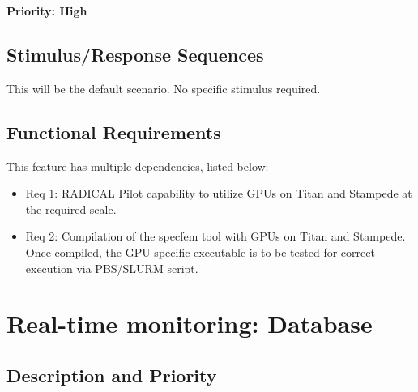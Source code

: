 \documentclass{scrreprt}
\begin{document}
\textbf{Priority: High}

\subsection{Stimulus/Response Sequences}

This will be the default scenario. No specific stimulus required.

\subsection{Functional Requirements}


This feature has multiple dependencies, listed below:

\begin{itemize}[noitemsep]
\item Req 1: RADICAL Pilot capability to utilize GPUs on Titan and Stampede at the required scale.
\item Req 2: Compilation of the specfem tool with GPUs on Titan and Stampede. Once compiled, the GPU specific executable is to be tested for correct execution via PBS/SLURM script.
\end{itemize}


\section{Real-time monitoring: Database}


\subsection{Description and Priority}
\end{document}

